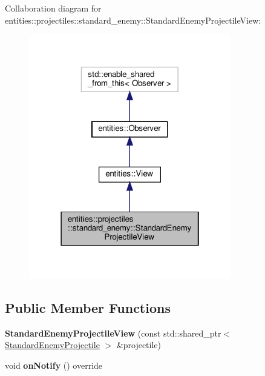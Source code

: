 Collaboration diagram for entities\+:\+:projectiles\+:\+:standard\+\_\+enemy\+:\+:Standard\+Enemy\+Projectile\+View\+:\nopagebreak
\begin{figure}[H]
\begin{center}
\leavevmode
\includegraphics[width=250pt]{classentities_1_1projectiles_1_1standard__enemy_1_1StandardEnemyProjectileView__coll__graph}
\end{center}
\end{figure}
\subsection*{Public Member Functions}
\begin{DoxyCompactItemize}
\item 
\mbox{\label{classentities_1_1projectiles_1_1standard__enemy_1_1StandardEnemyProjectileView_a427269c9aa0e8b59e424dda56e8bb3cd}} 
{\bfseries Standard\+Enemy\+Projectile\+View} (const std\+::shared\+\_\+ptr$<$ \hyperlink{classentities_1_1projectiles_1_1standard__enemy_1_1StandardEnemyProjectile}{Standard\+Enemy\+Projectile} $>$ \&projectile)
\item 
\mbox{\label{classentities_1_1projectiles_1_1standard__enemy_1_1StandardEnemyProjectileView_a25fd3839b1dc9964fd256650a82c8237}} 
void {\bfseries on\+Notify} () override
\end{DoxyCompactItemize}
